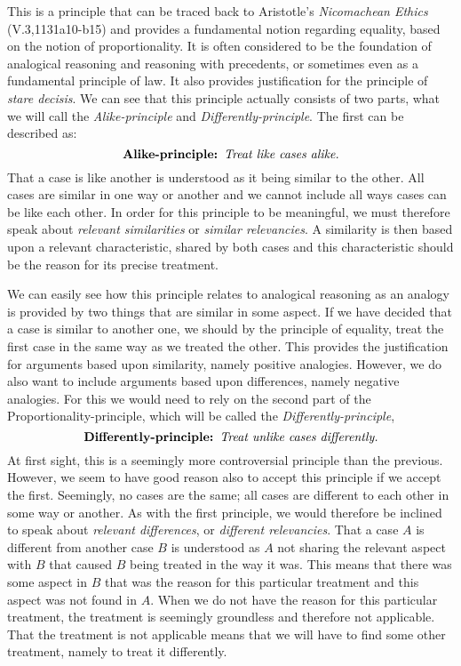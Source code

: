 		
	This is a principle that can be traced back to Aristotle's \textit{Nicomachean Ethics} (V.3,1131a10-b15) and provides a fundamental notion regarding equality, based on the notion of proportionality. It is often considered to be the foundation of analogical reasoning and reasoning with precedents, or sometimes even as a fundamental principle of law. It also provides justification for the principle of \textit{stare decisis}. We can see that this principle actually consists of two parts, what we will call the \textit{Alike-principle} and \textit{Differently-principle}. The first can be described as:
		\[
			\textbf{Alike-principle\index{principle!alike}: } \textit{Treat like cases alike.}
		\] 
	That a case is like another is understood as it being similar to the other. All cases are similar in one way or another and we cannot include all ways cases can be like each other. In order for this principle to be meaningful, we must therefore speak about \textit{relevant similarities} or \textit{similar relevancies}. A similarity is then based upon a relevant characteristic, shared by both cases and this characteristic should be the reason for its precise treatment.
	
	We can easily see how this principle relates to analogical reasoning as an analogy is provided by two things that are similar in some aspect. If we have decided that a case is similar to another one, we should by the principle of equality, treat the first case in the same way as we treated the other. This provides the justification for arguments based upon similarity, namely positive analogies. However, we do also want to include arguments based upon differences, namely negative analogies. For this we would need to rely on the second part of the Proportionality-principle, which will be called the \textit{Differently-principle}, 
		\[
			\textbf{Differently-principle\index{principle!differently}: } \textit{Treat unlike cases differently.}
		\]
	At first sight, this is a seemingly more controversial principle than the previous. However, we seem to have good reason also to accept this principle if we accept the first. Seemingly, no cases are the same; all cases are different to each other in some way or another. As with the first principle, we would therefore be inclined to speak about \textit{relevant differences}, or \textit{different relevancies}. That a case $A$ is different from another case $B$ is understood as $A$ not sharing the relevant aspect with $B$ that caused $B$ being treated in the way it was. This means that there was some aspect in $B$ that was the reason for this particular treatment and this aspect was not found in $A$. When we do not have the reason for this particular treatment, the treatment is seemingly groundless and therefore not applicable. That the treatment is not applicable means that we will have to find some other treatment, namely to treat it differently. 
	
